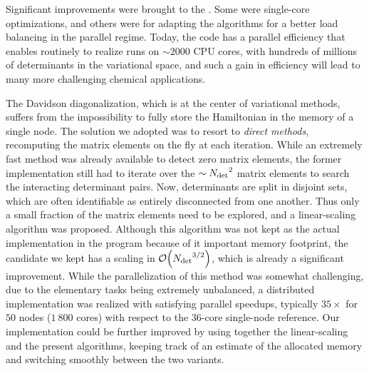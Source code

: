 \documentclass[12pt,a4paper]{report}
\begin{document}
Significant improvements were brought to the \QP. Some were single-core
optimizations, and others were for adapting the algorithms for a better load
balancing in the parallel regime. Today, the code has a parallel efficiency
that enables routinely to realize runs on $\sim 2000$ CPU cores, with
hundreds of millions of determinants in the variational space, and such a gain
in efficiency will lead to many more challenging chemical applications.

The Davidson diagonalization, which is at the center of variational methods, suffers from the impossibility to fully store the Hamiltonian in the memory of a single node. The solution we adopted was to resort to \emph{direct methods}, recomputing the matrix elements on the fly at each iteration. While an extremely fast method was already available to detect zero matrix elements,\cite{Scemama_2013} the former implementation still had to iterate over the $\sim {N_\text{det}}^2$ matrix elements to search the interacting determinant pairs. Now, determinants are split in disjoint sets, which are often identifiable as entirely disconnected from one another. Thus only a small fraction of the matrix elements need to be explored, and a linear-scaling algorithm was proposed. Although this algorithm was not kept as the actual implementation in the program because of it important memory footprint, the candidate we kept has a scaling in $\order{\Ndet^{3/2}}$, which is already a significant improvement.
While the parallelization of this method was somewhat challenging, due to the elementary tasks being extremely unbalanced, a distributed implementation was realized with satisfying parallel speedups, typically $35\times$ for $50$ nodes ($1~800$ cores) with respect to the $36$-core single-node reference.
Our implementation could be further improved by using together the linear-scaling and the present
algorithms, keeping track of an estimate of the allocated memory and switching smoothly between the
two variants.
\end{document}
